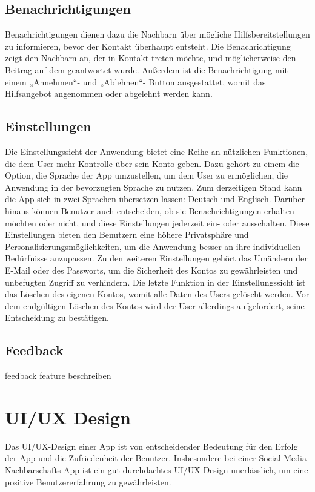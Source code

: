 \subsection{Benachrichtigungen}
\author{Sandin Habibovic}
Benachrichtigungen dienen dazu die Nachbarn über mögliche Hilfsbereitstellungen zu informieren, bevor der Kontakt überhaupt entsteht. Die Benachrichtigung zeigt den Nachbarn an, der in Kontakt treten möchte, und möglicherweise den Beitrag auf dem geantwortet wurde. Außerdem ist die Benachrichtigung mit einem „Annehmen“- und „Ablehnen“- Button ausgestattet, womit das Hilfsangebot angenommen oder abgelehnt werden kann.

\subsection{Einstellungen}
\author{Sandin Habibovic}
Die Einstellungssicht der Anwendung bietet eine Reihe an nützlichen Funktionen, die dem User mehr Kontrolle über sein Konto geben. 
Dazu gehört zu einem die Option, die Sprache der App umzustellen, um dem User zu ermöglichen, die Anwendung in der bevorzugten Sprache zu nutzen. Zum derzeitigen Stand kann die App sich in zwei Sprachen übersetzen lassen: Deutsch und Englisch.
Darüber hinaus können Benutzer auch entscheiden, ob sie Benachrichtigungen erhalten möchten oder nicht, und diese Einstellungen jederzeit ein- oder ausschalten. Diese Einstellungen bieten den Benutzern eine höhere Privatsphäre und Personalisierungsmöglichkeiten, um die Anwendung besser an ihre individuellen Bedürfnisse anzupassen.
Zu den weiteren Einstellungen gehört das Umändern der E-Mail oder des Passworts, um die Sicherheit des Kontos zu gewährleisten und unbefugten Zugriff zu verhindern.
Die letzte Funktion in der Einstellungssicht ist das Löschen des eigenen Kontos, womit alle Daten des Users gelöscht werden. Vor dem endgültigen Löschen des Kontos wird der User allerdings aufgefordert, seine Entscheidung zu bestätigen.

\subsection{Feedback}
feedback feature beschreiben


\section{UI/UX Design}
Das UI/UX-Design einer App ist von entscheidender Bedeutung für den Erfolg der App und die Zufriedenheit der Benutzer. Insbesondere bei einer Social-Media-Nachbarschafts-App ist ein gut durchdachtes UI/UX-Design unerlässlich, um eine positive Benutzererfahrung zu gewährleisten.

